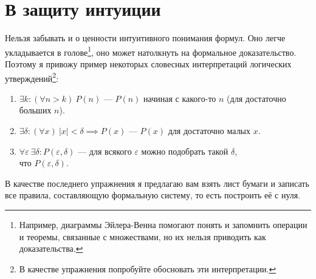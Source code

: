 \pagebreak

\part{В защиту интуиции}

Нельзя забывать и о ценности интуитивного понимания формул.
Оно легче укладывается в голове\footnote{Например, диаграммы
	Эйлера-Венна помогают понять и запомнить операции и теоремы, связанные с
	множествами, но их нельзя приводить как доказательства.},
оно может натолкнуть на формальное доказательство. Поэтому я привожу пример
некоторых словесных интерпретаций логических утверждений\footnote{В качестве
	упражнения попробуйте обосновать эти интерпретации.}:
\begin{enumerate}
	\item{}$\exists k:(\forall n>k)~P(n)$ --- $P(n)$ начиная с какого-то $n$
	(для достаточно больших $n$).
	\item{}$\exists \delta:(\forall x)~|x|<\delta\implies P(x)$ --- $P(x)$ для
	достаточно малых $x$.
	\item{}$\forall \varepsilon~\exists \delta:P(\varepsilon,\delta)$ ---
	для всякого $\varepsilon$ можно подобрать такой $\delta$,\\что $P(\varepsilon,\delta)$.
\end{enumerate}

В качестве последнего упражнения я предлагаю вам взять лист бумаги и записать
все правила, составляющую формальную систему, то есть построить её с нуля.

